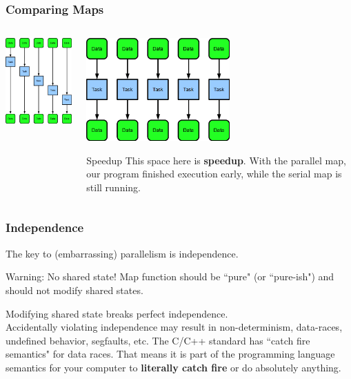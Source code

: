 \documentclass[xcolor=dvipsnames]{beamer}
\begin{document}
		\begin{frame}[fragile] \frametitle{Comparing Maps}
			\begin{columns}
				\begin{column}{0.5\textwidth}
					\includegraphics[width=55mm]{images/map_serial.png}
			    \end{column}
	  			\begin{column}{0.5\textwidth}
					\includegraphics[width=55mm]{images/map_parallel.png}\pause
					\begin{block}{Speedup}
						This space here is \textbf{speedup}. With the parallel
                        map, our program finished execution early, while the 
                        serial map is still running.
					\end{block}
			     \end{column}
			\end{columns}
		\end{frame}
			
		\begin{frame} \frametitle{Independence}
			The key to (embarrassing) parallelism is independence.\pause
			\begin{alertblock}{Warning: No shared state!}
				Map function should be ``pure" (or ``pure-ish") and should not 
	            modify shared states.
			\end{alertblock}
			Modifying shared state breaks perfect independence.\\Accidentally
			violating independence may result in non-determinism, data-races, 
			undefined behavior, segfaults, etc. \pause The C/C++ standard has 
			``catch fire semantics" for data races. That means it is part of the 
			programming language semantics for your computer to \textbf{literally
			catch fire} or do absolutely anything.
		\end{frame}
			
\end{document}
